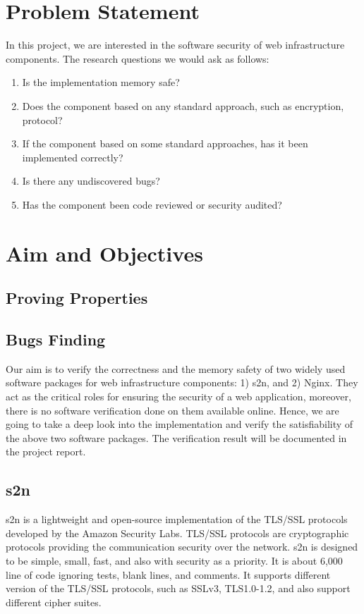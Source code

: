 \section{Problem Statement}
In this project, we are interested in the software security of web infrastructure components. The research questions we would ask as follows:

\begin{enumerate}
    \item Is the implementation memory safe?
    \item Does the component based on any standard approach, such as encryption, protocol?
    \item If the component based on some standard approaches, has it been implemented correctly?
    \item Is there any undiscovered bugs?
    \item Has the component been code reviewed or security audited?
\end{enumerate}

\section{Aim and Objectives}
\subsection{Proving Properties}

\subsection{Bugs Finding}


Our aim is to verify the correctness and the memory safety of two widely used software packages for web infrastructure components: 1) s2n, and 2) Nginx. They act as the critical roles for ensuring the security of a web application, moreover, there is no software verification done on them available online. Hence, we are going to take a deep look into the implementation and verify the satisfiability of the above two software packages. The verification result will be documented in the project report.

\subsection{s2n}
s2n \cite{3_the_s2n_user_manual} is a lightweight and open-source implementation of the TLS/SSL protocols developed by the Amazon Security Labs. TLS/SSL protocols are cryptographic protocols providing the communication security over the network. s2n is designed to be simple, small, fast, and also with security as a priority. It is about 6,000 line of code ignoring tests, blank lines, and comments. It supports different version of the TLS/SSL protocols, such as SSLv3, TLS1.0-1.2, and also support different cipher suites.  
